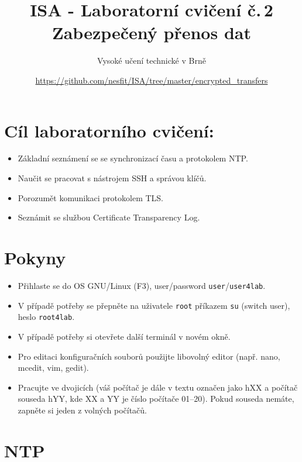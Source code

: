 \documentclass[a4paper,11pt]{article}
\title{ISA - Laboratorní cvičení č.\,2\\
{\bf\large Zabezpečený přenos dat}}
\author{Vysoké učení technické v Brně}
\date{\url{https://github.com/nesfit/ISA/tree/master/encrypted_transfers}}
\begin{document}
{\let\newpage\relax\maketitle}

\section*{Cíl laboratorního cvičení:}
\begin{itemize}
  \item Základní seznámení se se synchronizací času a protokolem NTP.
  \item Naučit se pracovat s nástrojem SSH a správou klíčů.
  \item Porozumět komunikaci protokolem TLS.
  \item Seznámit se službou Certificate Transparency Log.
\end{itemize}

\section*{Pokyny}
\begin{itemize}
  \item Přihlaste se do OS GNU/Linux (F3), user/password {\tt user}/{\tt user4lab}.
  \item V případě potřeby se přepněte na uživatele {\tt root} příkazem {\tt su}
  (switch user), heslo {\tt root4lab}.
  \item V případě potřeby si otevřete další terminál v novém okně.
  \item Pro editaci konfiguračních souborů použijte libovolný editor (např.
  nano, mcedit, vim, gedit).
\item Pracujte ve dvojicích (váš počítač je dále v textu označen jako hXX a
  počítač souseda hYY, kde XX a YY je číslo počítače 01--20).
  Pokud souseda nemáte, zapněte si jeden z volných počítačů.

\end{itemize}

\section{NTP}
\end{document}
